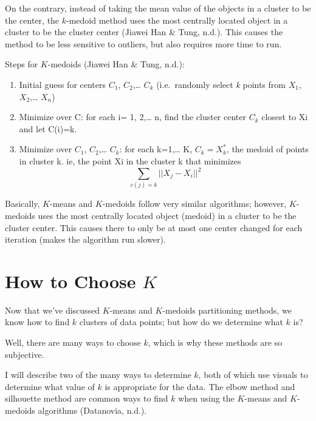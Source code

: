 \documentclass[12pt,twoside]{amherstthesis}
\begin{document}
  On the contrary, instead of taking the mean value of the objects in a
  cluster to be the center, the \(k\)-medoid method uses the most
  centrally located object in a cluster to be the cluster center (Jiawei
  Han \& Tung, n.d.). This causes the method to be less sensitive to
  outliers, but also requires more time to run.
  
  Steps for \(K\)-medoids (Jiawei Han \& Tung, n.d.):
  
  \begin{enumerate}
  \def\labelenumi{\arabic{enumi}.}
  \item
    Initial guess for centers \(C_1\), \(C_2\),\ldots{} \(C_k\)
    (i.e.~randomly select \emph{k} points from \(X_1\), \(X_2\),\ldots{}
    \(X_n\))
  \item
    Minimize over C: for each i= 1, 2,\ldots{} n, find the cluster center
    \(C_k\) closest to Xi and let C(i)=k.
  \item
    Minimize over \(C_1\), \(C_2\),\ldots{} \(C_k\): for each k=1,\ldots{}
    K, \(C_k = X_k^*\), the medoid of points in cluster k. ie, the point
    Xi in the cluster k that minimizes
    \[\sum  _{c(j)=k} ||{{X_j- X_i}}||^2\]
  \end{enumerate}
  
  Basically, \(K\)-means and \(K\)-medoids follow very similar algorithms;
  however, \(K\)-medoids uses the most centrally located object (medoid)
  in a cluster to be the cluster center. This causes there to only be at
  most one center changed for each iteration (makes the algorithm run
  slower).
  
  \section{\texorpdfstring{How to Choose
  \(K\)}{How to Choose K}}\label{how-to-choose-k}
  
  Now that we've discussed \(K\)-means and \(K\)-medoids partitioning
  methods, we know how to find \(k\) clusters of data points; but how do
  we determine what \(k\) is?
  
  Well, there are many ways to choose \(k\), which is why these methods
  are so subjective.
  
  I will describe two of the many ways to determine \(k\), both of which
  use visuals to determine what value of \(k\) is appropriate for the
  data. The elbow method and silhouette method are common ways to find
  \(k\) when using the \(K\)-means and \(K\)-medoids algorithms
  (Datanovia, n.d.).
  
\end{document}

